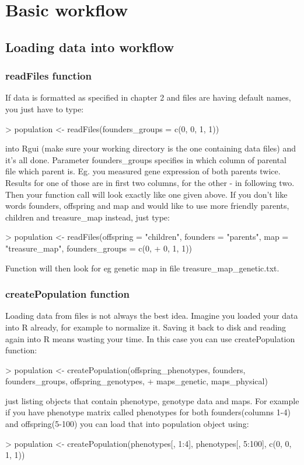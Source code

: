 \documentclass{article}
\begin{document}
\newpage
\section{Basic workflow}
\subsection{Loading data into workflow}
\subsubsection{readFiles function}
If data is formatted as specified in chapter 2 and files are having default names, you just have to type: 
\begin{Schunk}
\begin{Sinput}
> population <- readFiles(founders_groups = c(0, 0, 1, 1))
\end{Sinput}
\end{Schunk}
 into Rgui (make sure your working directory is the one containing data files) and it's all done. Parameter founders\_groups specifies in which column of parental file which parent is. Eg. you measured gene expression of both parents twice. Results for one of those are in first two columns, for the other - in following two. Then your function call will look exactly like one given above. 
If you don't like words founders, offspring and map and would like to use more friendly parents, children and treasure\_map instead, just type:
\begin{Schunk}
\begin{Sinput}
> population <- readFiles(offspring = "children", founders = "parents", map = "treasure_map", founders_groups = c(0, 
+     0, 1, 1))
\end{Sinput}
\end{Schunk}
Function will then look for eg genetic map in file treasure\_map\_genetic.txt.
\subsubsection{createPopulation function}
Loading data from files is not always the best idea. Imagine you loaded your data into R already, for example to normalize it. Saving it back to disk and reading again into R means wasting your time. In this case you can use createPopulation function:
\begin{Schunk}
\begin{Sinput}
> population <- createPopulation(offspring_phenotypes, founders, founders_groups, offspring_genotypes, 
+     maps_genetic, maps_physical)
\end{Sinput}
\end{Schunk}
just listing objects that contain phenotype, genotype data and maps. For example if you have phenotype matrix called phenotypes for both founders(columns 1-4) and offspring(5-100) you can load that into population object using:
\begin{Schunk}
\begin{Sinput}
> population <- createPopulation(phenotypes[, 1:4], phenotypes[, 5:100], c(0, 0, 1, 1))
\end{Sinput}
\end{Schunk}
\end{document}

